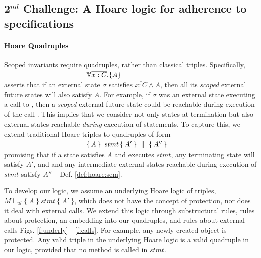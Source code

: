 {{  
  \subsection{2$^{nd}$ Challenge:  A Hoare logic for adherence to specifications}  
 \label{sec:howSecond}

\paragraph{Hoare Quadruples} Scoped invariants require quadruples, rather than  classical triples.
Specifically, \\
  $\strut \ \hspace{4cm} {\TwoStatesN  {\overline{x:C}}  {A}}$\\
 asserts that if an external {state} $\sigma$ 
 satisfies  $\overline {x:C} \wedge A$, then all its \emph{scoped} external future  states will   also  satisfy  $A$. 
For example, if $\sigma$ was an external state executing a call to , then a \emph{scoped} external future  state
 could be reachable during execution of the   call .
This implies that we consider not only states at termination but also external states reachable
 \emph{during} execution of  statements. 
To  capture this, we extend   traditional Hoare triples to quadruples of  form\\
 $\strut \ \hspace{4cm} \quadruple {A} {\, stmt\, }{A'} {A''}$\\  
 promising that if a state satisfies $A$ and executes $stmt$, any terminating state will satisfy $A'$, and 
 and  any intermediate external states reachable during execution of $stmt$ satisfy    $A''$ -- \cf Def. \ref{def:hoare:sem}.
 
\vspace{.1cm}

To develop our logic, we   assume  an  underlying   Hoare logic  of  triples, 
$ M \vdash_{ul} \{ \ A\ \} {\ stmt\ }\{\ A'\ \} $,
which does not {have} the concept of protection, nor does it deal with external calls.
We extend this logic through  
substructural rules,   rules about protection,  an embedding into our quadruples, and rules about external calls
\cf Figs. \ref{f:underly} -  \ref{f:calls}.
%
For example, any newly created object is protected. Any %
valid triple in the underlying Hoare logic is a valid quadruple in our logic, provided that no method is called in $stmt$.


}}
